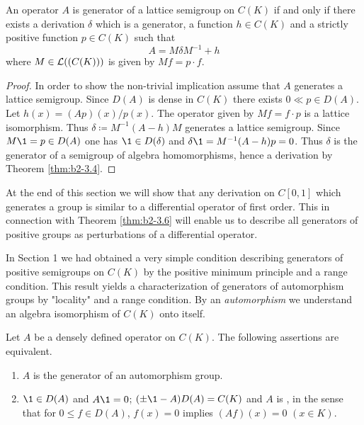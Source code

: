 \begin{theorem}\label{thm:b2-3.6}
An operator $A$ is generator of a lattice semigroup on $C(K)$ if and only if there exists a derivation $\delta$ which is a generator, a function $h \in C(K)$ and a strictly positive function $p \in C(K)$ such that
\begin{equation} \label{eq:b2-3.7}
A = M\delta M^{-1} + h
\end{equation}
where $M \in \mathcal{L}((C(K)))$ is given by $Mf = p \cdot f$.
\end{theorem}

\begin{proof}
In order to show the non-trivial implication assume that $A$ generates a lattice semigroup.
Since $D(A)$ is dense in $C(K)$ there exists $0 \ll p \in D(A)$.
Let $h(x) = (Ap)(x)/p(x)$.
The operator given by $Mf = f \cdot p$ is a lattice isomorphism.
Thus $\delta \coloneqq M^{-1}(A - h)M$ generates a lattice semigroup.
Since $M\1 = p \in D(A)$ one has $\1 \in D(\delta)$ and $\delta\1 = M^{-1}(A - h)p = 0$.
Thus $\delta$ is the generator of a semigroup of algebra homomorphisms, hence a derivation by Theorem \ref{thm:b2-3.4}.
\end{proof}

At the end of this section we will show that any derivation on $C[0,1]$ which generates a group is similar to a differential operator of first order.
This in connection with Theorem \ref{thm:b2-3.6} will enable us to describe all generators of positive groups as perturbations of a differential operator.

In Section 1 we had obtained a very simple condition describing generators of positive semigroups on $C(K)$ by the positive minimum principle and a range condition.
This result yields a characterization of generators of automorphism groups by "locality" and a range condition.
By an \emph{automorphism} we understand an algebra isomorphism of $C(K)$ onto itself.
\begin{theorem}\label{thm:b2-3.7}
Let $A$ be a densely defined operator on $C(K)$.
The following assertions are equivalent.
\begin{enumerate}[\upshape (a)]
\item \label{thm:b2-3.7-1}
$A$ is the generator of an automorphism group.
\item \label{thm:b2-3.7-2}
$\1 \in D(A)$ and $A\1 = 0$; $(\pm \1 - A)D(A) = C(K)$ and $A$ is , in the sense that for $0 \leq f \in D(A)$, $f(x) = 0$ implies $(Af)(x) = 0$ $(x \in K)$.
\end{enumerate}
\end{theorem}

